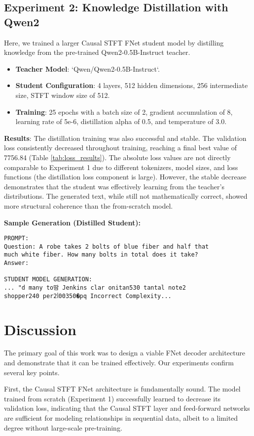 \documentclass[11pt,a4paper]{article}
\begin{document}
\subsection{Experiment 2: Knowledge Distillation with Qwen2}
Here, we trained a larger Causal STFT FNet student model by distilling knowledge from the pre-trained Qwen2-0.5B-Instruct teacher.
\begin{itemize}
    \item \textbf{Teacher Model}: `Qwen/Qwen2-0.5B-Instruct`.
    \item \textbf{Student Configuration}: 4 layers, 512 hidden dimensions, 256 intermediate size, STFT window size of 512.
    \item \textbf{Training}: 25 epochs with a batch size of 2, gradient accumulation of 8, learning rate of 5e-6, distillation alpha of 0.5, and temperature of 3.0.
\end{itemize}

\textbf{Results}: The distillation training was also successful and stable. The validation loss consistently decreased throughout training, reaching a final best value of 7756.84 (Table \ref{tab:loss_results}). The absolute loss values are not directly comparable to Experiment 1 due to different tokenizers, model sizes, and loss functions (the distillation loss component is large). However, the stable decrease demonstrates that the student was effectively learning from the teacher's distributions. The generated text, while still not mathematically correct, showed more structural coherence than the from-scratch model.

\textbf{Sample Generation (Distilled Student):}
\begin{verbatim}
PROMPT:
Question: A robe takes 2 bolts of blue fiber and half that 
much white fiber. How many bolts in total does it take?
Answer:

STUDENT MODEL GENERATION:
... "d many to땀 Jenkins clar onitan530 tantal note2 
shopper240 per2ᥣ00350�pq Incorrect Complexity...
\end{verbatim}

\section{Discussion}
The primary goal of this work was to design a viable FNet decoder architecture and demonstrate that it can be trained effectively. Our experiments confirm several key points.

First, the Causal STFT FNet architecture is fundamentally sound. The model trained from scratch (Experiment 1) successfully learned to decrease its validation loss, indicating that the Causal STFT layer and feed-forward networks are sufficient for modeling relationships in sequential data, albeit to a limited degree without large-scale pre-training.
\end{document}
